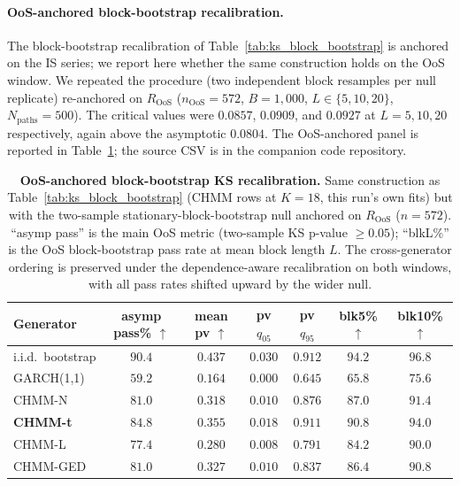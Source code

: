 \paragraph{OoS-anchored block-bootstrap recalibration.}
\label{sec:ks_block_bootstrap_oos}
The block-bootstrap recalibration of Table~\ref{tab:ks_block_bootstrap} is anchored on the IS series; we report here whether the same construction holds on the OoS window. We repeated the procedure (two independent block resamples per null replicate) re-anchored on $R_{\text{OoS}}$ ($n_{\text{OoS}} = 572$, $B = 1{,}000$, $L \in \{5, 10, 20\}$, $N_{\text{paths}} = 500$). The critical values were $0.0857$, $0.0909$, and $0.0927$ at $L = 5, 10, 20$ respectively, again above the asymptotic $0.0804$. The OoS-anchored panel is reported in Table~\ref{tab:ks_block_bootstrap_oos}; the source CSV is in the companion code repository.

\begin{table}[!ht]
\centering
\small
\caption{\textbf{OoS-anchored block-bootstrap KS recalibration.} Same construction as Table~\ref{tab:ks_block_bootstrap} (CHMM rows at $K = 18$, this run's own fits) but with the two-sample stationary-block-bootstrap null anchored on $R_{\text{OoS}}$ ($n = 572$). ``asymp pass'' is the main OoS metric (two-sample KS p-value $\ge 0.05$); ``blkL\%'' is the OoS block-bootstrap pass rate at mean block length $L$. The cross-generator ordering is preserved under the dependence-aware recalibration on both windows, with all pass rates shifted upward by the wider null.}
\label{tab:ks_block_bootstrap_oos}
\begin{tabular}{l c c c c c c}
\toprule
Generator & asymp pass\% $\uparrow$ & mean pv $\uparrow$ & pv $q_{05}$ & pv $q_{95}$ & blk5\% $\uparrow$ & blk10\% $\uparrow$ \\
\midrule
i.i.d.\ bootstrap & $90.4$ & $0.437$ & $0.030$ & $0.912$ & $94.2$ & $96.8$ \\
GARCH(1,1)        & $59.2$ & $0.164$ & $0.000$ & $0.645$ & $65.8$ & $75.6$ \\
CHMM-N            & $81.0$ & $0.318$ & $0.010$ & $0.876$ & $87.0$ & $91.4$ \\
\textbf{CHMM-t}   & $\mathbf{84.8}$ & $\mathbf{0.355}$ & $0.018$ & $\mathbf{0.911}$ & $\mathbf{90.8}$ & $\mathbf{94.0}$ \\
CHMM-L            & $77.4$ & $0.280$ & $0.008$ & $0.791$ & $84.2$ & $90.0$ \\
CHMM-GED          & $81.0$ & $0.327$ & $0.010$ & $0.837$ & $86.4$ & $90.8$ \\
\bottomrule
\end{tabular}
\end{table}

